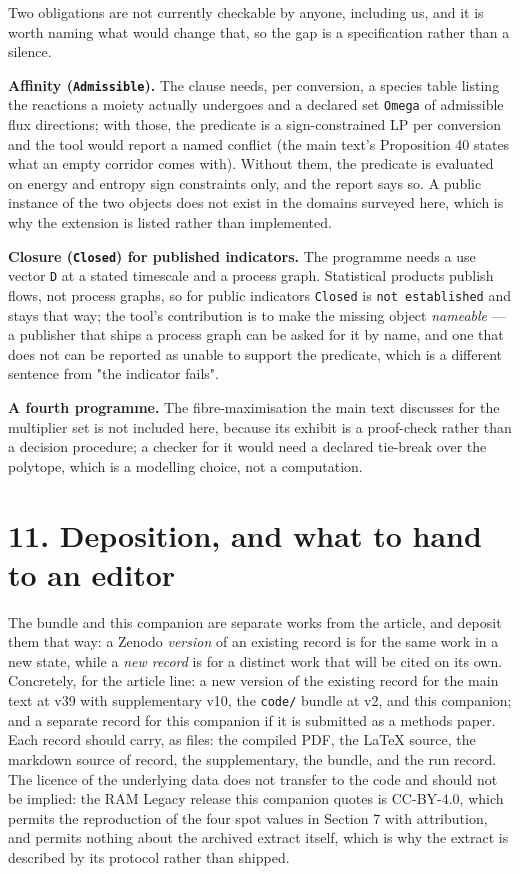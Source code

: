 \documentclass[11pt]{article}
\begin{document}
Two obligations are not currently checkable by anyone, including us, and it is worth naming what would change that, so the gap is a specification rather than a silence.

\textbf{Affinity (\texttt{Admissible}).} The clause needs, per conversion, a species table listing the reactions a moiety actually undergoes and a declared set \texttt{Omega} of admissible flux directions; with those, the predicate is a sign-constrained LP per conversion and the tool would report a named conflict (the main text's Proposition 40 states what an empty corridor comes with). Without them, the predicate is evaluated on energy and entropy sign constraints only, and the report says so. A public instance of the two objects does not exist in the domains surveyed here, which is why the extension is listed rather than implemented.

\textbf{Closure (\texttt{Closed}) for published indicators.} The programme needs a use vector \texttt{D} at a stated timescale and a process graph. Statistical products publish flows, not process graphs, so for public indicators \texttt{Closed} is \texttt{not established} and stays that way; the tool's contribution is to make the missing object \emph{nameable} --- a publisher that ships a process graph can be asked for it by name, and one that does not can be reported as unable to support the predicate, which is a different sentence from "the indicator fails".

\textbf{A fourth programme.} The fibre-maximisation the main text discusses for the multiplier set is not included here, because its exhibit is a proof-check rather than a decision procedure; a checker for it would need a declared tie-break over the polytope, which is a modelling choice, not a computation.

\vspace{0.8em}

\section*{11. Deposition, and what to hand to an editor}\label{11-deposition-and-what-to-hand-to-an-editor}

The bundle and this companion are separate works from the article, and deposit them that way: a Zenodo \emph{version} of an existing record is for the same work in a new state, while a \emph{new record} is for a distinct work that will be cited on its own. Concretely, for the article line: a new version of the existing record for the main text at v39 with supplementary v10, the \texttt{code/} bundle at v2, and this companion; and a separate record for this companion if it is submitted as a methods paper. Each record should carry, as files: the compiled PDF, the LaTeX source, the markdown source of record, the supplementary, the bundle, and the run record. The licence of the underlying data does not transfer to the code and should not be implied: the RAM Legacy release this companion quotes is CC-BY-4.0, which permits the reproduction of the four spot values in Section 7 with attribution, and permits nothing about the archived extract itself, which is why the extract is described by its protocol rather than shipped.
\end{document}
